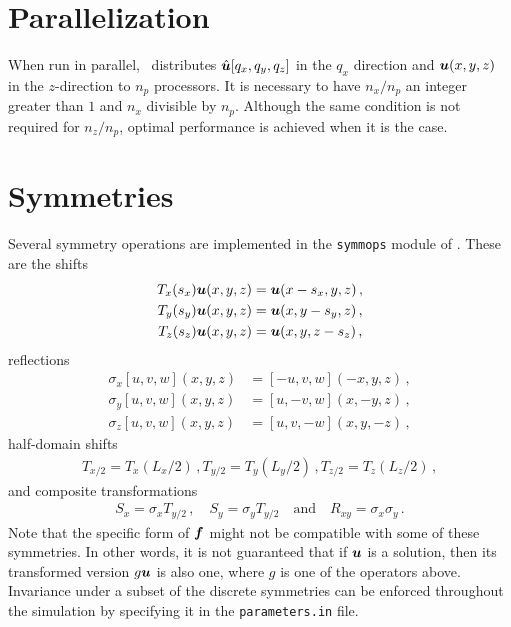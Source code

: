 \documentclass[a4paper, 11pt]{article}
\begin{document}
\section{Parallelization}

When run in parallel, \dnsbox\ distributes $\hat{\bm{u}} [q_x, q_y, q_z]$ in the $q_x$ direction 
and $\bm{u} (x, y, z)$ in the $z$-direction to $n_p$ processors. It is necessary to have 
$n_x / n_p$ an integer greater than $1$ and $n_x$ divisible by $n_p$. Although the same 
condition is not required for 
$n_z / n_p$, optimal performance is achieved when it is the case.

\section{Symmetries}

Several symmetry operations are implemented in the \texttt{symmops} module of 
\dnsbox . These are the shifts
\begin{align}
   T_x (s_x) \bm{u} (x, y, z) &= \bm{u} (x - s_x, y, z) \,, \\
   T_y (s_y) \bm{u} (x, y, z) &= \bm{u} (x, y - s_y, z) \,, \\
   T_z (s_z) \bm{u} (x, y, z) &= \bm{u} (x, y, z - s_z) \,,
\end{align}
reflections 
\begin{align}
    \sigma_x [u, v, w](x, y, z) &= [-u, v, w](-x, y, z) \,, \\
    \sigma_y [u, v, w](x, y, z) &= [u, -v, w](x, -y, z) \,, \\
    \sigma_z [u, v, w](x, y, z) &= [u, v, -w](x, y, -z) \,,
\end{align}
half-domain shifts 
\begin{align}
    T_{x/2} = T_x (L_x / 2)\,, T_{y/2} = T_y (L_y / 2)\,, T_{z/2} = T_z (L_z / 2)\,, 
\end{align}
and composite transformations
\begin{align}
    S_x = \sigma_x T_{y/2}\,,\quad
    S_y = \sigma_y T_{y/2} \quad\mbox{and}\quad 
    R_{xy} = \sigma_x \sigma_y \, .
\end{align}
Note that the specific form of $\bm{f}$ might not be compatible with some of these symmetries. In other words,
it is not guaranteed that if $\bm{u}$ is a solution, then its transformed version $g \bm{u}$ is also one, 
where $g$ is one of the operators above. Invariance under a subset of the discrete symmetries 
can be enforced throughout the simulation by specifying it in the \texttt{parameters.in} file. 
\end{document}

